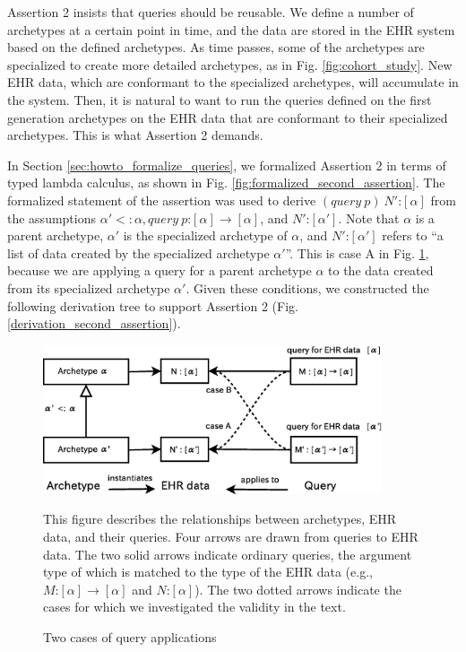 \documentclass[preprint,3p,onecolumn,times,review]{article}
\begin{document}
{Assertion 2 insists that queries should be reusable.
We define a number of archetypes at a certain point in time, and the data are stored in the EHR system based on the defined archetypes.
As time passes, some of the archetypes are specialized to create more detailed archetypes, as in Fig. {\ref{fig:cohort_study}}. New EHR data, which are conformant to the specialized archetypes, will accumulate in the system.
Then, it is natural to want to run the queries defined on the first generation archetypes on the EHR data that are conformant to their specialized archetypes.
This is what Assertion 2 demands.

In Section \ref{sec:howto_formalize_queries}, we formalized Assertion 2 in terms of typed lambda calculus, as shown in Fig. \ref{fig:formalized_second_assertion}.
The formalized statement of the assertion was used to derive $(query~p)~N' \text{:}[\alpha]$ from the assumptions $\alpha' <: \alpha, query~p\text{:}[\alpha] \rightarrow [\alpha]$, and $N'\text{:}[\alpha']$.
Note that $\alpha$ is a parent archetype, $\alpha'$ is the specialized archetype of $\alpha$, and $N' \text{:} [\alpha']$ refers to ``a list of data created by the specialized archetype $\alpha'$''.
This is case A in Fig. \ref{fig:archetype_queries}, because we are applying a query for a parent archetype $\alpha$ to the data created from its specialized archetype $\alpha'$.
Given these conditions, we constructed the following derivation tree to support Assertion 2 (Fig. \ref{derivation_second_assertion}).


\begin{figure}[!htbp]
  \begin{center}
    \includegraphics[width=10cm,clip]{archetype_based_queries.eps}  
  \end{center}
\caption{Two cases of query applications}\label{fig:archetype_queries}
{\footnotesize
  This figure describes the relationships between archetypes, EHR data, and their queries. Four arrows are drawn from queries to EHR data. The two solid arrows indicate ordinary queries, the argument type of which is matched to the type of the EHR data (e.g., $M\text{:}[\alpha] \rightarrow [\alpha]$ and $N\text{:}[\alpha]$). The two dotted arrows indicate the cases for which we investigated the validity in the text.
  }
\end{figure}


}
\end{document}
